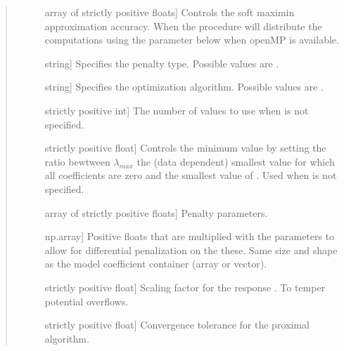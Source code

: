 \documentclass[letterpaper,10pt,english]{sphinxmanual}
\begin{document}
\begin{fulllineitems}
\begin{quote}
\begin{description}
\begin{description}
\item[{}] \leavevmode{[}array of strictly positive floats{]}
\sphinxAtStartPar
Controls  the soft maximin approximation accuracy. When  
the procedure will distribute
the computations using the    parameter below when openMP is available.

\item[{}] \leavevmode{[}string{]}
\sphinxAtStartPar
Specifies the penalty type. Possible values are .

\item[{}] \leavevmode{[}string{]}
\sphinxAtStartPar
Specifies the optimization algorithm. Possible values are .

\item[{}] \leavevmode{[}strictly positive int{]}
\sphinxAtStartPar
The number of  values to use when  is not specified.

\item[{}] \leavevmode{[}strictly positive float{]}
\sphinxAtStartPar
Controls the minimum  value by setting the ratio bewtween 
\(\lambda_{max}\) \textendash{} the (data dependent) smallest value for which all 
coefficients are zero \textendash{}  and the smallest value of .
Used when  is not specified.

\item[{}] \leavevmode{[}array of strictly positive floats{]}
\sphinxAtStartPar
Penalty parameters.

\item[{}] \leavevmode{[}np.array{]}
\sphinxAtStartPar
Positive floats  that are multiplied with the parameters to allow for
differential penalization on the these. Same size and shape as the model 
coefficient container (array or vector).

\item[{}] \leavevmode{[}strictly positive float{]}
\sphinxAtStartPar
Scaling factor for the response   . To temper potential overflows.

\item[{}] \leavevmode{[}strictly positive float{]}
\sphinxAtStartPar
Convergence tolerance for the proximal algorithm.


\end{description}
\end{description}
\end{quote}
\end{fulllineitems}
\end{document}
